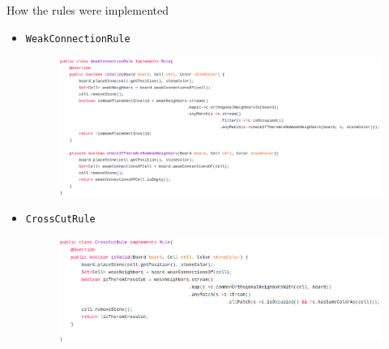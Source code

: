 \documentclass{beamer}
\begin{document}
\begin{frame}[t]{How the rules were implemented }
 \begin{itemize}
  \item \texttt{WeakConnectionRule}
  \vspace{0.2cm}
  \
  \begin{figure}
   \center\includegraphics[scale=0.24]{images/weak-connection-rule-code.png}
  \end{figure}
  \item \texttt{CrossCutRule}
  \vspace{0.2cm}
  \begin{figure}
   \center\includegraphics[scale=0.24]{images/cross-cut-rule-code.png}
  \end{figure}
 \end{itemize}
\end{frame}
\end{document}
